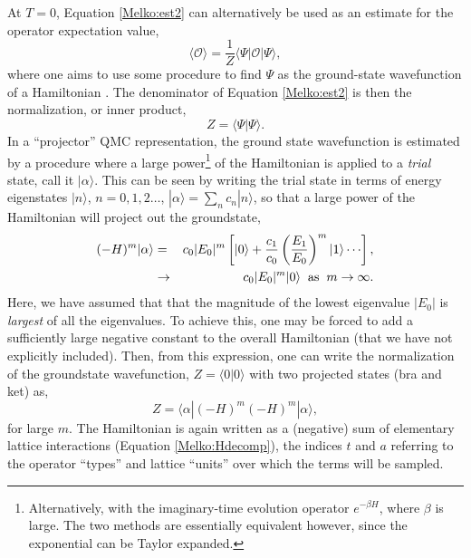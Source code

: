 \documentclass[vecphys]{svmult}
\begin{document}
At $T=0$, Equation \ref{Melko:est2} can alternatively be used as an estimate for the operator expectation value,
\begin{equation}
\langle \mathcal{O} \rangle  = \frac{1}{Z} \langle \Psi | \mathcal{O} | \Psi \rangle, \label{Melko:zeroExpet}
\end{equation}
where one aims to use some procedure to find $\Psi$ as the ground-state wavefunction of a Hamiltonian \cite{Melko:Sandvik05}.  
The denominator of Equation \ref{Melko:est2} is then the normalization, or inner product,
\begin{equation}
Z =  \langle \Psi | \Psi \rangle.
\end{equation}
In a ``projector'' QMC representation, the ground state wavefunction is estimated by a procedure where a large power\footnote{Alternatively, with the imaginary-time evolution operator $e^{-\beta H}$, where $\beta$ is large.  The two methods are essentially equivalent however, since the exponential can be Taylor expanded.} of the Hamiltonian is applied to a {\it trial} state, call it $|\alpha \rangle$.  This can be seen by writing the trial state in terms of energy eigenstates $|n \rangle$, $n=0,1,2 \ldots$,
$|\alpha \rangle= \sum_n c_n |n \rangle$, so that 
a large power of the Hamiltonian will project out the groundstate,
\begin{eqnarray}
(-H)^m |\alpha \rangle &=& c_0|E_0|^m \left[{  |0 \rangle + \frac{c_1}{c_0} \left({ \frac{E_1}{E_0} }\right)^m|1 \rangle \cdots  }\right], \\
&\rightarrow& c_0|E_0|^m |0 \rangle \hspace{2mm} {\rm as} \hspace{2mm} m \rightarrow \infty. \nonumber
\end{eqnarray}
Here, we have assumed that that the magnitude of the lowest eigenvalue $|E_0|$ is {\it largest} of all the eigenvalues.  To achieve this, one may be forced to add a sufficiently large negative constant to the overall Hamiltonian (that we have not explicitly included).
Then, from this expression, one can write the normalization of the groundstate wavefunction, $Z=\langle 0 | 0 \rangle$ with two projected states (bra and ket) as,
\begin{equation}
Z = \langle \alpha | (-H)^m (-H)^m | \alpha \rangle, \label{Melko:normZ2}
\end{equation}
for large $m$.  
The Hamiltonian is again written as a (negative) sum of elementary lattice interactions (Equation \ref{Melko:Hdecomp}), the indices $t$ and $a$ referring to the operator ``types'' and lattice ``units'' over which the terms will be sampled.  
\end{document}
